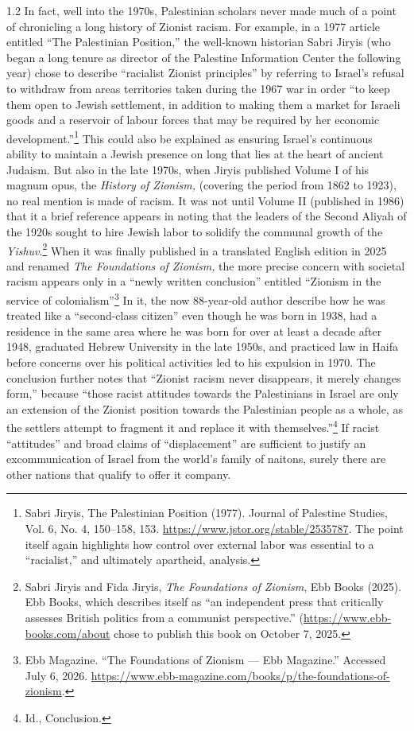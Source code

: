 \documentclass[../unravbook.tex]{subfiles}
\begin{document}
\begin{spacing}{1.2}
In fact, well into the 1970s, Palestinian scholars never made much of a point of chronicling a long history of Zionist racism. For example, in a 1977 article entitled ``The Palestinian Position,'' the well-known historian Sabri Jiryis (who began a long tenure as director of the Palestine Information Center the following year) chose to describe \enquote{racialist Zionist principles} by referring to Israel's refusal to withdraw from areas territories taken during the 1967 war in order \enquote{to keep them open to Jewish settlement, in addition to making them a market for Israeli goods and a reservoir of labour forces that may be required by her economic development.}\footnote{Sabri Jiryis, The Palestinian Position (1977). Journal of Palestine Studies, Vol. 6, No. 4, 150--158, 153. \url{https://www.jstor.org/stable/2535787}. The point itself again highlights how control over external labor was essential to a \enquote{racialist,} and ultimately apartheid, analysis.} This could also be explained as ensuring Israel's continuous ability to maintain a Jewish presence on long that lies at the heart of ancient Judaism. But also in the late 1970s, when Jiryis published Volume I of his magnum opus, the \textit{History of Zionism,} (covering the period from 1862 to 1923), no real mention is made of racism. It was not until Volume II (published in 1986) that it a brief reference appears in noting that the leaders of the Second Aliyah of the 1920s sought to hire Jewish labor to solidify the communal growth of the \textit{Yishuv}.\footnote{Sabri Jiryis and Fida Jiryis, \textit{The Foundations of Zionism}, Ebb Books (2025). Ebb Books, which describes itself as \enquote{an independent press that critically assesses British politics from a communist perspective.} (\url{https://www.ebb-books.com/about} chose to publish this book on October 7, 2025.} When it was finally published in a translated English edition in 2025 and renamed \textit{The Foundations of Zionism,} the more precise concern with societal racism appears only in a ``newly written conclusion'' entitled \enquote{Zionism in the service of colonialism}\footnote{Ebb Magazine. \enquote{The Foundations of Zionism — Ebb Magazine.} Accessed July 6, 2026. \url{https://www.ebb-magazine.com/books/p/the-foundations-of-zionism}.} In it, the now 88-year-old author describe how he was treated like a ``second-class citizen'' even though he was born in 1938, had a residence in the same area where he was born for over at least a decade after 1948, graduated Hebrew University in the late 1950s, and practiced law in Haifa before concerns over his political activities led to his expulsion in 1970. The conclusion further notes that \enquote{Zionist racism never disappears, it merely changes form,} because \enquote{those racist attitudes towards the Palestinians in Israel are only an extension of the Zionist position towards the Palestinian people as a whole, as the settlers attempt to fragment it and replace it with themselves.}\footnote{Id., Conclusion.} If racist \enquote{attitudes} and broad claims of \enquote{displacement} are sufficient to justify an excommunication of Israel from the world's family of naitons, surely there are other nations that qualify to offer it company.


\end{spacing}
\end{document}
